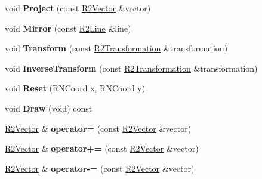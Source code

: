 \begin{DoxyCompactItemize}
\item 
void {\bfseries Project} (const \hyperlink{class_r2_vector}{R2\+Vector} \&vector)\hypertarget{class_r2_vector_a5e4376742632b36733e3bfe87421d382}{}\label{class_r2_vector_a5e4376742632b36733e3bfe87421d382}

\item 
void {\bfseries Mirror} (const \hyperlink{class_r2_line}{R2\+Line} \&line)\hypertarget{class_r2_vector_a630c6d2f03bb60b579d78e0231f25e0a}{}\label{class_r2_vector_a630c6d2f03bb60b579d78e0231f25e0a}

\item 
void {\bfseries Transform} (const \hyperlink{class_r2_transformation}{R2\+Transformation} \&transformation)\hypertarget{class_r2_vector_abe359376ecebb26fa14fdb38170d8149}{}\label{class_r2_vector_abe359376ecebb26fa14fdb38170d8149}

\item 
void {\bfseries Inverse\+Transform} (const \hyperlink{class_r2_transformation}{R2\+Transformation} \&transformation)\hypertarget{class_r2_vector_a8ccfbe1acb83f1088e0c6cf432917903}{}\label{class_r2_vector_a8ccfbe1acb83f1088e0c6cf432917903}

\item 
void {\bfseries Reset} (R\+N\+Coord x, R\+N\+Coord y)\hypertarget{class_r2_vector_a5e93c1548324067601788d5d39edfbbe}{}\label{class_r2_vector_a5e93c1548324067601788d5d39edfbbe}

\item 
void {\bfseries Draw} (void) const \hypertarget{class_r2_vector_ac9ef6f2c7251f3be6766aedf400158b2}{}\label{class_r2_vector_ac9ef6f2c7251f3be6766aedf400158b2}

\item 
\hyperlink{class_r2_vector}{R2\+Vector} \& {\bfseries operator=} (const \hyperlink{class_r2_vector}{R2\+Vector} \&vector)\hypertarget{class_r2_vector_ad4df4303a924dcc4098f69928f61c091}{}\label{class_r2_vector_ad4df4303a924dcc4098f69928f61c091}

\item 
\hyperlink{class_r2_vector}{R2\+Vector} \& {\bfseries operator+=} (const \hyperlink{class_r2_vector}{R2\+Vector} \&vector)\hypertarget{class_r2_vector_a0f9afd0a7f748405058a1740a218c541}{}\label{class_r2_vector_a0f9afd0a7f748405058a1740a218c541}

\item 
\hyperlink{class_r2_vector}{R2\+Vector} \& {\bfseries operator-\/=} (const \hyperlink{class_r2_vector}{R2\+Vector} \&vector)\hypertarget{class_r2_vector_af22b058fb6a661c7a858c8d9459af979}{}\label{class_r2_vector_af22b058fb6a661c7a858c8d9459af979}


\end{DoxyCompactItemize}
